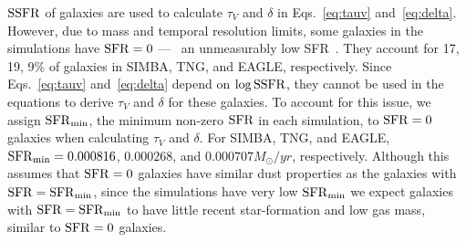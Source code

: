 

${\rm SSFR}$ of galaxies are used to calculate $\tau_V$ and $\delta$ in
Eqs.~\ref{eq:tauv} and~\ref{eq:delta}. However, due to mass and temporal resolution limits,
some galaxies in the simulations have ${\rm SFR}=0$ --- \ie~an unmeasurably low
SFR~\citep{hahn2019c}. They account for 17, 19, 9\% of galaxies
in SIMBA, TNG, and EAGLE, respectively. Since Eqs.~\ref{eq:tauv}
and~\ref{eq:delta} depend on $\log{\rm SSFR}$, they cannot be used in the equations
to derive $\tau_V$ and $\delta$ for these galaxies. To account for this issue,
we assign ${\rm SFR}_{\rm min}$, the minimum non-zero ${\rm SFR}$ in each simulation, to
${\rm SFR}=0$ galaxies when calculating $\tau_V$ and $\delta$. For SIMBA, TNG, and
EAGLE, ${\rm SFR}_{\rm min}=0.000816$, $0.000268$, and $0.000707 M_\odot/yr$,
respectively. Although 
this assumes that ${\rm SFR}=0$ galaxies have similar dust properties as the galaxies 
with ${\rm SFR} = {\rm SFR}_{\rm min}$, since the simulations have very low ${\rm SFR}_{\rm min}$ 
we expect galaxies with ${\rm SFR} = {\rm SFR}_{\rm min}$ to have little recent
star-formation and low gas mass, similar to ${\rm SFR}=0$ galaxies. 


